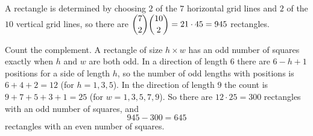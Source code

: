 A rectangle is determined by choosing $2$ of the $7$ horizontal grid lines and $2$ of the $10$ vertical grid lines, so there are $\dbinom72\dbinom{10}2=21\cdot45=945$ rectangles.

Count the complement. A rectangle of size $h\times w$ has an odd number of squares exactly when $h$ and $w$ are both odd. In a direction of length $6$ there are $6-h+1$ positions for a side of length $h$, so the number of odd lengths with positions is $6+4+2=12$ (for $h=1,3,5$). In the direction of length $9$ the count is $9+7+5+3+1=25$ (for $w=1,3,5,7,9$). So there are $12\cdot25=300$ rectangles with an odd number of squares, and
\[
945-300=\boxed{645}
\]
rectangles with an even number of squares.
